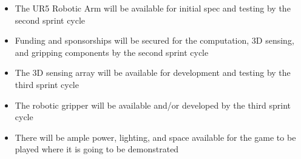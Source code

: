 \begin{itemize}
    \item The UR5 Robotic Arm will be available for initial spec and testing by the second sprint cycle
    \item Funding and sponsorships will be secured for the computation, 3D sensing, and gripping components by the second sprint cycle
    \item The 3D sensing array will be available for development and testing by the third sprint cycle
    \item The robotic gripper will be available and/or developed by the third sprint cycle
    \item There will be ample power, lighting, and space available for the game to be played where it is going to be demonstrated
\end{itemize}
